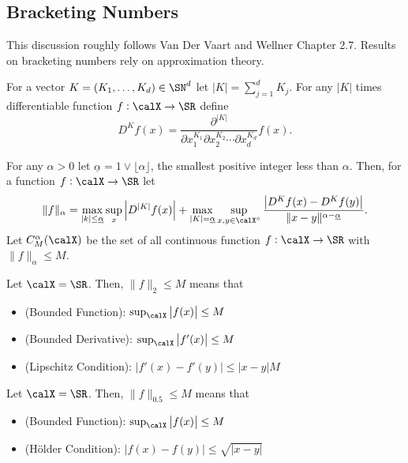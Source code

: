 \subsection{Bracketing Numbers}%
\label{subsec:bracketing}

This discussion roughly follows Van Der Vaart and Wellner Chapter 2.7. Results on bracketing numbers rely on approximation theory.

\begin{definition}
	\label{def:differential}
	For a vector \(K = (K_1,\dots,K_d) \in \SN^d\) let \(|K| = \sum_{j=1}^d K_j\). For any \(|K|\) times differentiable function \(f:\calX\to\SR\) define
	\[
		D^Kf(x) = \frac{\partial^{|K|}}{\partial x_1^{K_1}\partial x_2^{K_2}\cdots\partial x_d^{K_d}} f(x)
	.\] 
\end{definition}
\begin{definition}
	\label{def:differntial-norm}
	For any \(\alpha > 0\) let \(\underline{\alpha} = 1 \vee \lfloor \alpha \rfloor\), the smallest positive integer less than \(\alpha\). Then, for a function \(f:\calX\to\SR\) let 
	\[
		\|f\|_\alpha = \max_{|k|\leq \underline{\alpha}}\sup_x \left|D^{|K|}f(x)\right|  + \max_{|K|=\underline{\alpha}}\sup_{x,y\in\calX^{\circ}} \frac{\left|D^Kf(x)-D^Kf(y)\right|}{\|x-y\|^{\alpha - \underline{\alpha}} }  
	.\]
	Let \(C_M^\alpha(\calX)\) be the set of all continuous function \(f:\calX\to\SR\) with \(\|f\|_\alpha \leq M\).
\end{definition}
\begin{example*}
	Let \(\calX=\SR\). Then, \(\|f\|_2 \leq  M\) means that
	\begin{itemize}
		\item (Bounded Function): \(\sup_\calX \left|f(x)\right| \leq  M\)
		\item (Bounded Derivative): \(\sup_\calX \left|f'(x)\right| \leq M\)
		\item (Lipschitz Condition): \(|f'(x)-f'(y)| \leq |x-y|M\)
	\end{itemize} 
\end{example*} 

\begin{example*}
	Let \(\calX=\SR\). Then, \(\|f\|_{0.5} \leq  M\) means that
	\begin{itemize}
		\item (Bounded Function): \(\sup_\calX \left|f(x)\right|\leq M\)
		\item (Hölder Condition): \(\left|f(x)-f(y)\right|\leq \sqrt{|x-y|} \)
	\end{itemize}
\end{example*}

